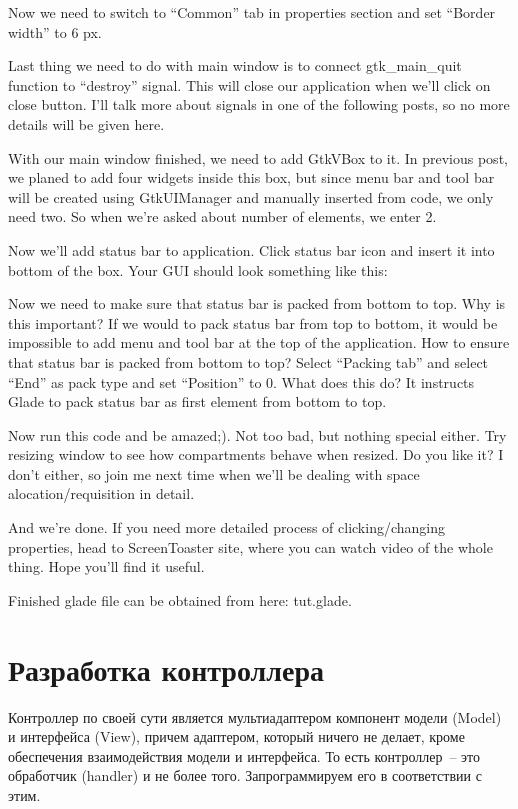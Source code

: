 \documentclass[a4paper,openany,twoside,draft]{book}
\begin{document}
 Now we need to switch to ``Common'' tab in properties section and set ``Border width'' to 6 px.

Last thing we need to do with main window is to connect gtk\_main\_quit function to ``destroy'' signal. This will close our application when we'll click on close button. I'll talk more about signals in one of the following posts, so no more details will be given here.

With our main window finished, we need to add GtkVBox to it. In previous post, we planed to add four widgets inside this box, but since menu bar and tool bar will be created using GtkUIManager and manually inserted from code, we only need two. So when we're asked about number of elements, we enter 2.

Now we'll add status bar to application. Click status bar icon and insert it into bottom of the box. Your GUI should look something like this:

Now we need to make sure that status bar is packed from bottom to top. Why is this important? If we would to pack status bar from top to bottom, it would be impossible to add menu and tool bar at the top of the application. How to ensure that status bar is packed from bottom to top? Select ``Packing tab'' and select ``End'' as pack type and set ``Position'' to 0. What does this do? It instructs Glade to pack status bar as first element from bottom to top.

Now run this code and be amazed;). Not too bad, but nothing special either. Try resizing window to see how compartments behave when resized. Do you like it? I don't either, so join me next time when we'll be dealing with space alocation/requisition in detail.

And we're done. If you need more detailed process of clicking/changing properties, head to ScreenToaster site, where you can watch video of the whole thing. Hope you'll find it useful.

Finished glade file can be obtained from here: tut.glade.

\section{Разработка контроллера}
\label{sec:gtkcontroller}

Контроллер по своей сути является мультиадаптером компонент модели (Model) и интерфейса (View), причем адаптером, который ничего не делает, кроме обеспечения взаимодействия модели и интерфейса.  То есть контроллер~-- это обработчик (handler) и не более того.  Запрограммируем его в соответствии с этим.
\end{document}
